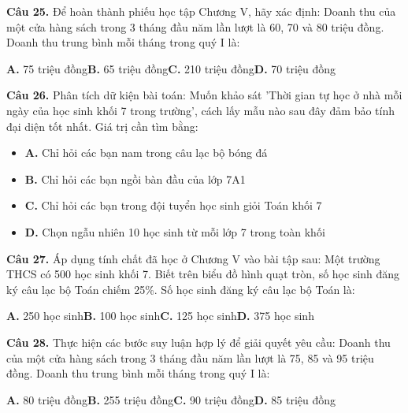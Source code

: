 \documentclass[11pt,a4paper]{article}
\begin{document}
\textbf{\color{primary} Câu 25.} Để hoàn thành phiếu học tập Chương V, hãy xác định: Doanh thu của một cửa hàng sách trong 3 tháng đầu năm lần lượt là 60, 70 và 80 triệu đồng. Doanh thu trung bình mỗi tháng trong quý I là:\par
\hspace*{1.5em}\textbf{A.} 75 triệu đồng\quad\quad \textbf{B.} 65 triệu đồng\quad\quad \textbf{C.} 210 triệu đồng\quad\quad \textbf{D.} 70 triệu đồng\par\vspace{2pt}
\textbf{\color{primary} Câu 26.} Phân tích dữ kiện bài toán: Muốn khảo sát 'Thời gian tự học ở nhà mỗi ngày của học sinh khối 7 trong trường', cách lấy mẫu nào sau đây đảm bảo tính đại diện tốt nhất. Giá trị cần tìm bằng:\par
\begin{itemize}\setlength{\itemsep}{1pt}\setlength{\parskip}{0pt}
  \item[] \textbf{A.} Chỉ hỏi các bạn nam trong câu lạc bộ bóng đá
  \item[] \textbf{B.} Chỉ hỏi các bạn ngồi bàn đầu của lớp 7A1
  \item[] \textbf{C.} Chỉ hỏi các bạn trong đội tuyển học sinh giỏi Toán khối 7
  \item[] \textbf{D.} Chọn ngẫu nhiên 10 học sinh từ mỗi lớp 7 trong toàn khối
\end{itemize}\vspace{2pt}
\textbf{\color{primary} Câu 27.} Áp dụng tính chất đã học ở Chương V vào bài tập sau: Một trường THCS có 500 học sinh khối 7. Biết trên biểu đồ hình quạt tròn, số học sinh đăng ký câu lạc bộ Toán chiếm 25\%. Số học sinh đăng ký câu lạc bộ Toán là:\par
\hspace*{1.5em}\textbf{A.} 250 học sinh\quad\quad \textbf{B.} 100 học sinh\quad\quad \textbf{C.} 125 học sinh\quad\quad \textbf{D.} 375 học sinh\par\vspace{2pt}
\textbf{\color{primary} Câu 28.} Thực hiện các bước suy luận hợp lý để giải quyết yêu cầu: Doanh thu của một cửa hàng sách trong 3 tháng đầu năm lần lượt là 75, 85 và 95 triệu đồng. Doanh thu trung bình mỗi tháng trong quý I là:\par
\hspace*{1.5em}\textbf{A.} 80 triệu đồng\quad\quad \textbf{B.} 255 triệu đồng\quad\quad \textbf{C.} 90 triệu đồng\quad\quad \textbf{D.} 85 triệu đồng\par\vspace{2pt}
\end{document}
